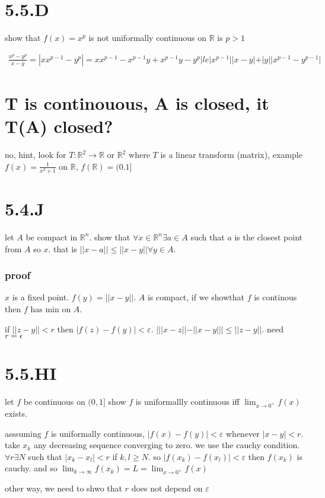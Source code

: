 \documentclass[letterpaper]{article}
\begin{document}
\section*{5.5.D}
show that $f(x)=x^p$ is not uniformally continuous on $\mathbb{R}$ is $p>1$

\begin{align*}
  \frac{x^p-y^p}{x-y}=|xx^{p-1}-y^p|=xx^{p-1}-x^{p-1}y+x^{p-1}y-y^{p}|le |x^{p-1}||x-y|+|y||x^{p-1}-y^{p-1}|
\end{align*}
\section*{T is continouous, A is closed, it T(A) closed?}
no, hint, look for $T:\mathbb{R}^2\to \mathbb{R}$ or $\mathbb{R}^2$
 where $T$ is a linear transform (matrix), example $f(x)=\frac{1}{x^2+1}$ on $\mathbb{R}$, $f(\mathbb{R})=(0.1]$

 \section*{5.4.J}
 let $A$ be compact in $\mathbb{R}^n$. show that $\forall x\in \mathbb{R}^n\exists a\in A$ such that $a$ is the closest point from $A$ so $x$. that is $||x-a||\le||x-y||\forall y \in A$.
 \subsubsection*{proof}
 $x$ is a fixed point. $f(y)=||x-y||$. $A$ is compact, if we showthat $f$ is continous then $f$ has  min on $A$.

 if $||z-y||<r$ then $|f(z)-f(y)|<\varepsilon$. $| ||x-z||-||x-y|| |\le ||z-y||$. need $r=\epsilon$
\section*{5.5.HI}
let $f$ be continuous on $(0,1]$ show $f$ is uniformallly continuous iff $\lim_{x\to 0^+}f(x)$ exists.

asssuming $f$ is uniformally continuous, $|f(x)-f(y)|<\varepsilon$ whenever $|x-y|<r$. take $x_k$ any decreasing sequence converging to zero. we use the cauchy condition. $\forall r\exists N$ such that $|x_k-x_l|<r$ if $k,l\ge N$. so $|f(x_k)-f(x_l)|<\varepsilon$ then $f(x_k)$ is cauchy. and so $\lim_{k\to\infty}f(x_k)=L=\lim_{x\to0^+}f(x)$

other way, we need to shwo that $r$ does not depend on $\varepsilon$
\end{document}
